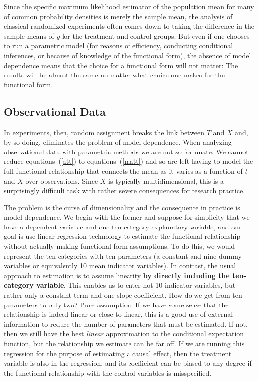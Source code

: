 \documentclass[11pt,titlepage]{article}
\begin{document}
Since the specific maximum likelihood estimator of the population mean
for many of common probability densities is merely the sample mean,
the analysis of classical randomized experiments often comes down to
taking the difference in the sample means of $y$ for the treatment and
control groups.  But even if one chooses to run a parametric model
(for reasons of efficiency, conducting conditional inferences, or
because of knowledge of the functional form), the absence of model
dependence means that the choice for a functional form will not
matter: The results will be almost the same no matter what choice one
makes for the functional form.

\subsection{Observational Data} \label{s:paraobs}

In experiments, then, random assignment breaks the link between $T$
and $X$ and, by so doing, eliminates the problem of model dependence.
When analyzing observational data with parametric methods we are not
so fortunate.  We cannot reduce equations~(\ref{att}) to
equations~(\ref{matt}) and so are left having to model the full
functional relationship that connects the mean as it varies as a
function of $t$ and $X$ over observations.  Since $X$ is typically
multidimensional, this is a surprisingly difficult task with rather
severe consequences for research practice.

The problem is the curse of dimensionality and the consequence in
practice is model dependence.  We begin with the former and suppose
for simplicity that we have a dependent variable and one ten-category
explanatory variable, and our goal is use linear regression technology
to estimate the functional relationship without actually making
functional form assumptions.  To do this, we would represent the ten
categories with ten parameters (a constant and nine dummy variables or
equivalently 10 mean indicator variables).  In contrast, the usual
approach to estimation is to assume linearity {\bf by directly
  including the ten-category variable}.  This enables us to enter not
10 indicator variables, but rather only a constant term and one slope
coefficient.  How do we get from ten parameters to only two?  Pure
assumption.  If we have some sense that the relationship is indeed
linear or close to linear, this is a good use of external information
to reduce the number of parameters that must be estimated.  If not,
then we still have the best {\it linear} approximation to the
conditional expectation function, but the relationship we estimate can
be far off.  If we are running this regression for the purpose of
estimating a causal effect, then the treatment variable is also in the
regression, and its coefficient can be biased to any degree if the
functional relationship with the control variables is misspecified.
\end{document}
